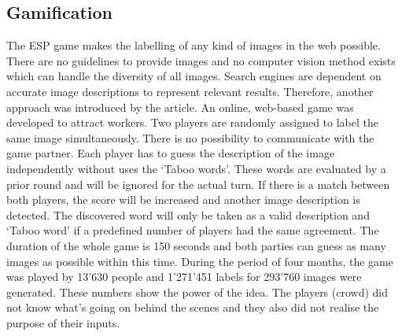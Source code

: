 \subsection{Gamification}
The ESP game\cite{esp} makes the labelling of any kind of images in the web possible. There are no guidelines to provide images and no computer vision method exists which can handle the diversity of all images. Search engines are dependent on accurate image descriptions to represent relevant results. Therefore, another approach was introduced by the article. An online, web-based game was developed to attract workers. Two players are randomly assigned to label the same image simultaneously. There is no possibility to communicate with the game partner. Each player has to guess the description of the image independently without uses the `Taboo words'. These words are evaluated by a prior round and will be ignored for the actual turn. If there is a match between both players, the score will be increased and another image description is detected. The discovered word will only be taken as a valid description and `Taboo word' if a predefined number of players had the same agreement. The duration of the whole game is 150 seconds and both parties can guess as many images as possible within this time. 
During the period of four months, the game was played by 13'630 people and 1'271'451 labels for 293'760 images were generated. These numbers show the power of the idea. The players (crowd) did not know what's going on behind the scenes and they also did not realise the purpose of their inputs.


